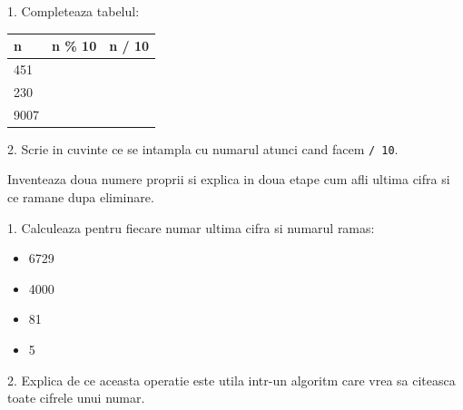 \newpage
{}

\begin{solobox}
  1. Completeaza tabelul:
  \begin{center}
  \begin{tabularx}{\linewidth}{|X|X|X|}
    \hline
    \textbf{n} & \textbf{n \% 10} & \textbf{n / 10} \\
    \hline
    451 & & \\
    \hline
    230 & & \\
    \hline
    9007 & & \\
    \hline
  \end{tabularx}
  \end{center}

  2. Scrie in cuvinte ce se intampla cu numarul atunci cand facem \texttt{/ 10}.
\end{solobox}

\begin{solobox}
  Inventeaza doua numere proprii si explica in doua etape cum afli ultima cifra si ce ramane dupa eliminare.
\end{solobox}

\newpage
{}

\begin{solobox}
  1. Calculeaza pentru fiecare numar ultima cifra si numarul ramas:
  \begin{itemize}
    \item 6729
    \item 4000
    \item 81
    \item 5
  \end{itemize}

  2. Explica de ce aceasta operatie este utila intr-un algoritm care vrea sa citeasca toate cifrele unui numar.
\end{solobox}
